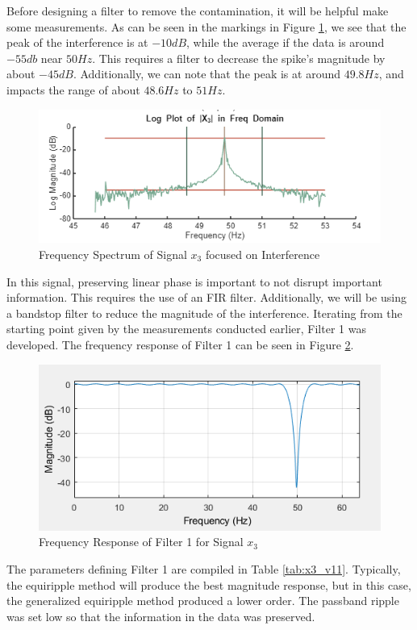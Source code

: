Before designing a filter to remove the contamination, it will be helpful make some measurements.  As can be seen in the markings in Figure \ref{fig:X3_marked}, we see that the peak of the interference is at $-10 \unit{dB}$, while the average if the data is around $-55 \unit{db}$ near $50 \unit{Hz}$.  This requires a filter to decrease the spike's magnitude by about $-45 \unit{dB}$.  Additionally, we can note that the peak is at around $49.8 \unit{Hz}$, and impacts the range of about $48.6 \unit{Hz}$ to $51 \unit{Hz}$.

\begin{figure}[H]
    \centering
    \includegraphics[width=0.5\linewidth]{figures/X3_prefilter_zoom.png}
    \caption{Frequency Spectrum of Signal $x_3$ focused on Interference}
    \label{fig:X3_marked}
\end{figure}

In this signal, preserving linear phase is important to not disrupt important information.  This requires the use of an FIR filter.  Additionally, we will be using a bandstop filter to reduce the magnitude of the interference. Iterating from the starting point given by the measurements conducted earlier, Filter 1 was developed.  The frequency response of Filter 1 can be seen in Figure \ref{fig:x1_v11_freqresponse}.

\begin{figure}[H]
    \centering
    \includegraphics[width=0.5\linewidth]{figures/x1_v11_freqresponse.png}
    \caption{Frequency Response of Filter 1 for Signal $x_3$}
    \label{fig:x1_v11_freqresponse}
\end{figure}

The parameters defining Filter 1 are compiled in Table \ref{tab:x3_v11}.  Typically, the equiripple method will produce the best magnitude response, but in this case, the generalized equiripple method produced a lower order.  The passband ripple was set low so that the information in the data was preserved.

